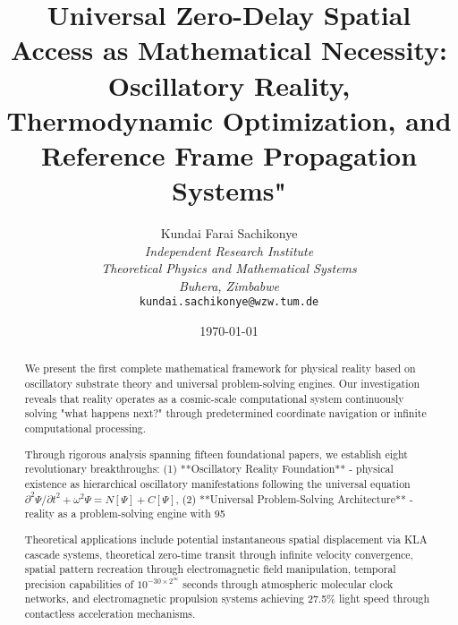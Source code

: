 \documentclass[12pt,a4paper]{article}
\title{\textbf{Universal Zero-Delay Spatial Access as Mathematical Necessity: Oscillatory Reality, Thermodynamic Optimization, and Reference Frame Propagation Systems"}}
\author{
Kundai Farai Sachikonye\\
\textit{Independent Research Institute}\\
\textit{Theoretical Physics and Mathematical Systems}\\
\textit{Buhera, Zimbabwe}\\
\texttt{kundai.sachikonye@wzw.tum.de}
}
\date{\today}
\theoremstyle{remark}
\begin{document}
\maketitle

\begin{abstract}
We present the first complete mathematical framework for physical reality based on oscillatory substrate theory and universal problem-solving engines. Our investigation reveals that reality operates as a cosmic-scale computational system continuously solving "what happens next?" through predetermined coordinate navigation or infinite computational processing. 

Through rigorous analysis spanning fifteen foundational papers, we establish eight revolutionary breakthroughs: (1) **Oscillatory Reality Foundation** - physical existence as hierarchical oscillatory manifestations following the universal equation $\partial^2\Psi/\partial t^2 + \omega^2\Psi = N[\Psi] + C[\Psi]$, (2) **Universal Problem-Solving Architecture** - reality as a problem-solving engine with 95%

Theoretical applications include potential instantaneous spatial displacement via KLA cascade systems, theoretical zero-time transit through infinite velocity convergence, spatial pattern recreation through electromagnetic field manipulation, temporal precision capabilities of $10^{-30 \times 2^{\infty}}$ seconds through atmospheric molecular clock networks, and electromagnetic propulsion systems achieving 27.5\% light speed through contactless acceleration mechanisms.


\end{abstract}
\end{document}
